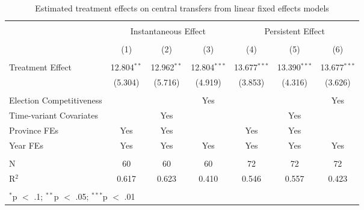 
\begin{table}[!htbp] \centering 
  \caption{Estimated treatment effects on central transfers from linear fixed effects models} 
  \label{tab:lfe_main} 
\begin{tabular}{@{\extracolsep{5pt}}lcccccc} 
\\[-1.8ex]\hline 
\hline \\[-1.8ex] 
 & \multicolumn{3}{c}{Instantaneous Effect} & \multicolumn{3}{c}{Persistent Effect} \\ 
\\[-1.8ex] & (1) & (2) & (3) & (4) & (5) & (6)\\ 
\hline \\[-1.8ex] 
 Treatment Effect & 12.804$^{**}$ & 12.962$^{**}$ & 12.804$^{***}$ & 13.677$^{***}$ & 13.390$^{***}$ & 13.677$^{***}$ \\ 
  & (5.304) & (5.716) & (4.919) & (3.853) & (4.316) & (3.626) \\ 
 \hline \\[-1.8ex] 
Election Competitiveness &  &  & Yes &  &  & Yes \\ 
Time-variant Covariates &  & Yes &  &  & Yes &  \\ 
Province FEs & Yes & Yes &  & Yes & Yes &  \\ 
Year FEs & Yes & Yes & Yes & Yes & Yes & Yes \\ 
\hline \\[-1.8ex] 
N & 60 & 60 & 60 & 72 & 72 & 72 \\ 
R$^{2}$ & 0.617 & 0.623 & 0.410 & 0.546 & 0.557 & 0.423 \\ 
\hline 
\hline \\[-1.8ex] 
\multicolumn{7}{l}{$^{*}$p $<$ .1; $^{**}$p $<$ .05; $^{***}$p $<$ .01} \\ 
\end{tabular} 
\end{table} 
